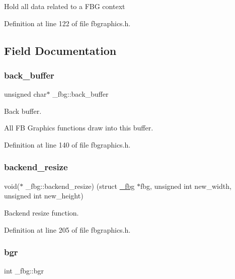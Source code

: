Hold all data related to a F\+BG context 

Definition at line 122 of file fbgraphics.\+h.



\subsection{Field Documentation}
\mbox{\label{struct__fbg_a907e7fc97965b972c17114c885e53735}} 
\subsubsection{\texorpdfstring{back\+\_\+buffer}{back\_buffer}}
{\footnotesize\ttfamily unsigned char$\ast$ \+\_\+fbg\+::back\+\_\+buffer}



Back buffer. 

All FB Graphics functions draw into this buffer. 

Definition at line 140 of file fbgraphics.\+h.

\mbox{\label{struct__fbg_aef07a92ae059ea2a43653f4d0c5d928e}} 
\subsubsection{\texorpdfstring{backend\+\_\+resize}{backend\_resize}}
{\footnotesize\ttfamily void($\ast$ \+\_\+fbg\+::backend\+\_\+resize) (struct \mbox{\hyperlink{struct__fbg}{\+\_\+fbg}} $\ast$fbg, unsigned int new\+\_\+width, unsigned int new\+\_\+height)}



Backend resize function. 



Definition at line 205 of file fbgraphics.\+h.

\mbox{\label{struct__fbg_a5844c5bf4789117cbc0c972ff160b338}} 
\subsubsection{\texorpdfstring{bgr}{bgr}}
{\footnotesize\ttfamily int \+\_\+fbg\+::bgr}



